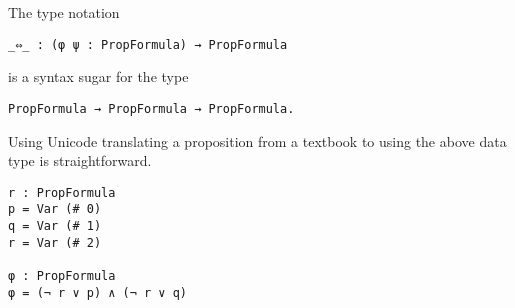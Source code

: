 \documentclass[../main.tex]{subfiles}
\begin{document}
\begin{remark}
The type notation
\begin{verbatim}
_⇔_ : (φ ψ : PropFormula) → PropFormula
\end{verbatim}
is a syntax sugar for the type
\begin{verbatim}
PropFormula → PropFormula → PropFormula.
\end{verbatim}
\end{remark}

\begin{example}
Using Unicode translating a proposition from a textbook to \Agda 
using the above data type is straightforward. 
\begin{verbatim}
r : PropFormula
p = Var (# 0)
q = Var (# 1)
r = Var (# 2)

φ : PropFormula
φ = (¬ r ∨ p) ∧ (¬ r ∨ q)
\end{verbatim}
\end{example}
\end{document}

